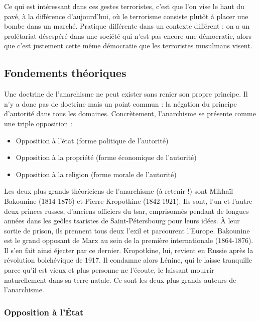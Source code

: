 \documentclass[12pt]{report}
\begin{document}
Ce qui est intéressant dans ces gestes terroristes, c'est que l'on vise le haut du pavé, à la différence d'aujourd'hui, où le terrorisme consiste plutôt à placer une bombe dans un marché.
Pratique différente dans un contexte différent : on a un prolétariat désespéré dans une société qui n'est pas encore une démocratie, alors que c'est justement cette même démocratie que les terroristes musulmans visent.

\subsection{Fondements théoriques}

Une doctrine de l’anarchisme ne peut exister sans renier son propre principe. 
Il n’y a donc pas de doctrine mais un point commun : la négation du principe d’autorité dans tous les domaines. 
Concrètement, l’anarchisme se présente comme une triple opposition :
\begin{itemize}
	\item Opposition à l’état (forme politique de l’autorité)
	\item Opposition à la propriété (forme économique de l’autorité)
	\item Opposition à la religion (forme morale de l’autorité)
\end{itemize}

Les deux plus grands théoriciens de l’anarchisme (à retenir !) sont Mikhaïl Bakounine (1814-1876) et Pierre Kropotkine (1842-1921). Ils sont, l'un et l’autre deux princes russes, d'anciens officiers du tsar, emprisonnés pendant de longues années dans les geôles tsaristes de Saint-Pétersbourg pour leurs idées. 
À leur sortie de prison, ils prennent tous deux l'exil et parcourent l'Europe.
Bakounine est le grand opposant de Marx au sein de la première internationale (1864-1876).
Il s'en fait ainsi éjecter par ce dernier.
Kropotkine, lui, revient en Russie après la révolution bolchévique de 1917. Il condamne alors Lénine, qui le laisse tranquille parce qu'il est vieux et plus personne ne l'écoute, le laissant mourrir naturellement dans sa terre natale.
Ce sont les deux plus grands auteurs de l'anarchisme.

\subsubsection{Opposition à l'État}
\end{document}
